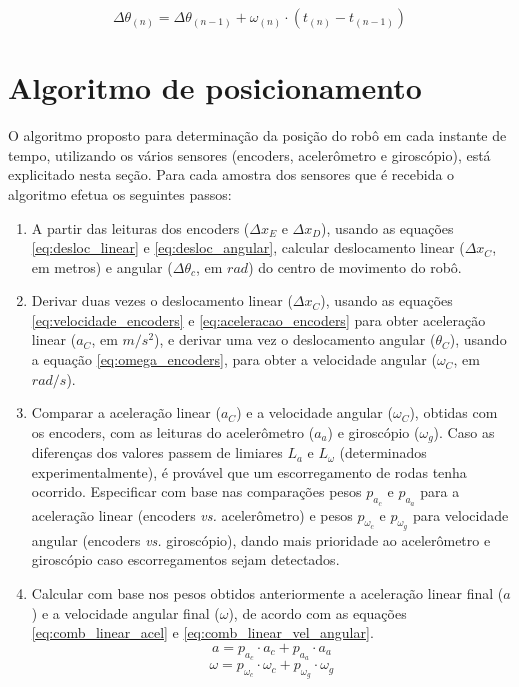 \begin{equation}
  \Delta \theta_{(n)} = \Delta \theta_{(n - 1)} + \omega_{(n)} \cdot (t_{(n)} - t_{(n-1)})
  \label{eq:theta_giroscopio}
\end{equation}


\section{Algoritmo de posicionamento}

O algoritmo proposto para determinação da posição do robô em cada instante de tempo, utilizando os vários sensores (encoders, acelerômetro e giroscópio), está explicitado nesta seção. Para cada amostra dos sensores que é recebida o algoritmo efetua os seguintes passos:

\begin{enumerate}
  \item A partir das leituras dos encoders ($\Delta x_E$ e $\Delta x_D$), usando as equações \ref{eq:desloc_linear} e \ref{eq:desloc_angular}, calcular deslocamento linear ($\Delta x_C$, em metros) e angular ($\Delta \theta_c$, em $rad$) do centro de movimento do robô.
  
  \item Derivar duas vezes o deslocamento linear ($\Delta x_C$), usando as equações \ref{eq:velocidade_encoders} e \ref{eq:aceleracao_encoders} para obter aceleração linear ($a_C$, em $m/s^2$), e derivar uma vez o deslocamento angular ($\theta_C$), usando a equação \ref{eq:omega_encoders}, para obter a velocidade angular ($\omega_C$, em $rad/s$).
  
  \item Comparar a aceleração linear ($a_C$) e a velocidade angular ($\omega_C$), obtidas com os encoders, com as leituras do acelerômetro ($a_a$) e giroscópio ($\omega_g$). Caso as diferenças dos valores passem de limiares $L_a$ e $L_\omega$ (determinados experimentalmente), é provável que um escorregamento de rodas tenha ocorrido. Especificar com base nas comparações pesos $p_{a_c}$ e $p_{a_a}$ para a aceleração linear (encoders \textit{vs.} acelerômetro) e pesos $p_{\omega_c}$ e $p_{\omega_g}$ para velocidade angular (encoders \textit{vs.} giroscópio), dando mais prioridade ao acelerômetro e giroscópio caso escorregamentos sejam detectados.
  \label{item:pesos}
  
  \item Calcular com base nos pesos obtidos anteriormente a aceleração linear final ($a$) e a velocidade angular final ($\omega$), de acordo com as equações \ref{eq:comb_linear_acel} e \ref{eq:comb_linear_vel_angular}.
  \begin{equation}
      a = p_{a_c} \cdot a_c + p_{a_a} \cdot a_a
      \label{eq:comb_linear_acel}
    \end{equation}
  \begin{equation}
      \omega = p_{\omega_c} \cdot \omega_c + p_{\omega_g} \cdot \omega_g
      \label{eq:comb_linear_vel_angular}
    \end{equation}    
  

\end{enumerate}
